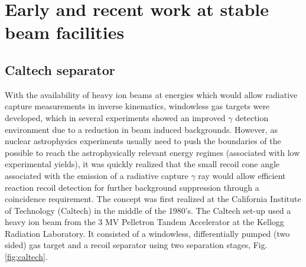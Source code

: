 \section{Early and recent work at stable beam facilities}

\subsection{Caltech separator}

With the availability of heavy ion beams at energies which would allow radiative capture measurements in inverse kinematics, windowless gas targets were developed, which in several experiments showed an improved $\gamma$ detection environment due to a reduction in beam induced backgrounds. However, as nuclear astrophysics experiments usually need to push the boundaries of the possible to reach the astrophysically relevant energy regimes (associated with low experimental yields), it was quickly realized that the small recoil cone angle associated with the emission of a radiative capture $\gamma$ ray would allow efficient reaction recoil detection for further background suppression through a coincidence requirement. The concept was first realized at the California Institute of Technology (Caltech) in the middle of the 1980's. The Caltech set-up used a heavy ion beam from the 3 MV Pelletron Tandem Accelerator at the Kellogg Radiation Laboratory. It consisted of a windowless, differentially pumped (two sided) gas target and a recoil separator using two separation stages, Fig. \ref{fig:caltech}.

